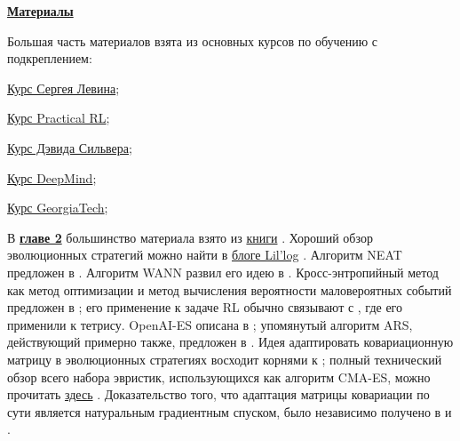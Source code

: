 \newcommand*{\sectionsources}[1]{\textbf{\textcolor{ChadBlue}{\underline{#1}}}}

\newpage
\begin{center}
\huge \textbf{\textcolor{ChadBlue}{\underline{Материалы}}}

\normalsize
\vspace{0.3cm}
Большая часть материалов взята из основных курсов по обучению с подкреплением:

\vspace{0.3cm}
\href{https://www.youtube.com/playlist?list=PL_iWQOsE6TfURIIhCrlt-wj9ByIVpbfGc}{Курс Сергея Левина}; %

\vspace{0.3cm}
\href{https://github.com/yandexdataschool/Practical_RL}{Курс Practical RL};

\vspace{0.3cm}
\href{https://www.davidsilver.uk/teaching/}{Курс Дэвида Сильвера};

\vspace{0.3cm}
\href{https://www.youtube.com/watch?v=ISk80iLhdfU&list=PLqYmG7hTraZBKeNJ-JE_eyJHZ7XgBoAyb&index=1}{Курс DeepMind};

\vspace{0.3cm}
\href{https://www.udacity.com/course/reinforcement-learning--ud600}{Курс GeorgiaTech};
\end{center}

В \underline{\textbf{главе 2}} большинство материала взято из \href{https://cs.gmu.edu/~sean/book/metaheuristics/Essentials.pdf}{книги} \cite{luke2013essentials}. Хороший обзор эволюционных стратегий можно найти в \href{https://lilianweng.github.io/lil-log/2019/09/05/evolution-strategies.html}{блоге Lil'log} \cite{weng2019ES}. Алгоритм NEAT предложен в \cite{stanley2002evolving}. Алгоритм WANN развил его идею в \cite{gaier2019weight}. Кросс-энтропийный метод как метод оптимизации и метод вычисления вероятности маловероятных событий предложен в \cite{botev2013cross}; его применение к задаче RL обычно связывают с \cite{szita2006learning}, где его применили к тетрису. OpenAI-ES описана в \cite{salimans2017evolution}; упомянутый алгоритм ARS, действующий примерно также, предложен в \cite{mania2018simple}. Идея адаптировать ковариационную матрицу в эволюционных стратегиях восходит корнями к \cite{hansen1996adapting}; полный технический обзор всего набора эвристик, использующихся как алгоритм CMA-ES, можно прочитать \href{https://arxiv.org/pdf/1604.00772.pdf}{здесь} \cite{hansen2016cma}. Доказательство того, что адаптация матрицы ковариации по сути является натуральным градиентным спуском, было независимо получено в \cite{akimoto2010bidirectional} и \cite{glasmachers2010exponential}.

